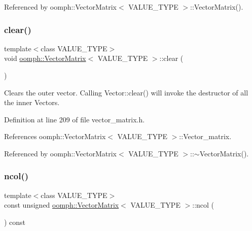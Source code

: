 Referenced by oomph\+::\+Vector\+Matrix$<$ V\+A\+L\+U\+E\+\_\+\+T\+Y\+P\+E $>$\+::\+Vector\+Matrix().

\mbox{\label{classoomph_1_1VectorMatrix_aa0f9cfd913d27cfb1e20e27a892d5468}} 
\subsubsection{\texorpdfstring{clear()}{clear()}}
{\footnotesize\ttfamily template$<$class V\+A\+L\+U\+E\+\_\+\+T\+Y\+PE$>$ \\
void \hyperlink{classoomph_1_1VectorMatrix}{oomph\+::\+Vector\+Matrix}$<$ V\+A\+L\+U\+E\+\_\+\+T\+Y\+PE $>$\+::clear (\begin{DoxyParamCaption}{ }\end{DoxyParamCaption})\hspace{0.3cm}{\ttfamily [inline]}}



Clears the outer vector. Calling Vector\+::clear() will invoke the destructor of all the inner Vectors. 



Definition at line 209 of file vector\+\_\+matrix.\+h.



References oomph\+::\+Vector\+Matrix$<$ V\+A\+L\+U\+E\+\_\+\+T\+Y\+P\+E $>$\+::\+Vector\+\_\+matrix.



Referenced by oomph\+::\+Vector\+Matrix$<$ V\+A\+L\+U\+E\+\_\+\+T\+Y\+P\+E $>$\+::$\sim$\+Vector\+Matrix().

\mbox{\label{classoomph_1_1VectorMatrix_a6f59576c296539356370814fc658f463}} 
\subsubsection{\texorpdfstring{ncol()}{ncol()}}
{\footnotesize\ttfamily template$<$class V\+A\+L\+U\+E\+\_\+\+T\+Y\+PE$>$ \\
const unsigned \hyperlink{classoomph_1_1VectorMatrix}{oomph\+::\+Vector\+Matrix}$<$ V\+A\+L\+U\+E\+\_\+\+T\+Y\+PE $>$\+::ncol (\begin{DoxyParamCaption}{ }\end{DoxyParamCaption}) const\hspace{0.3cm}{\ttfamily [inline]}}



